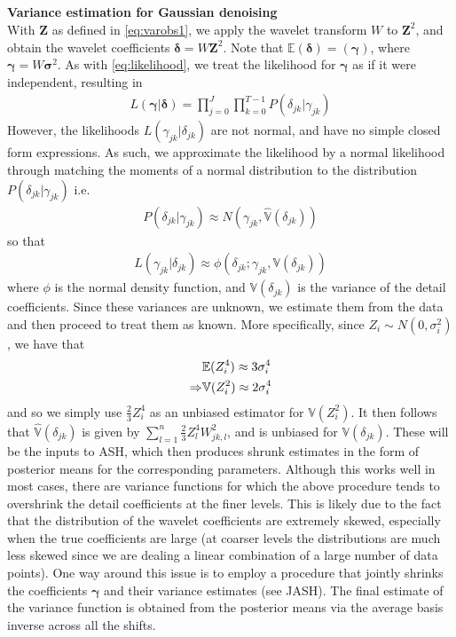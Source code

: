 \documentclass[12pt]{article}
\newcommand{\Gg}{\gamma}     \newcommand{\GG}{\Gamma}
\newcommand{\Gd}{\delta}     \newcommand{\GD}{\Delta}
\newcommand{\s}{\sigma}
\begin{document}
\begin{appendices}
\section{}\label{app:var estimation}\bigskip
\textbf{Variance estimation for Gaussian denoising}\bigskip\\
With $\bm{Z}$ as defined in \eqref{eq:varobs1}, we apply the wavelet transform $W$ to $\bm{Z}^2$, and obtain the wavelet coefficients $\bm{\Gd}=W\bm{Z}^2$. Note that $\mathbb{E}(\bm{\Gd})=(\bm{\Gg})$, where $\bm{\Gg}=W\bm{\s}^2$. As with \eqref{eq:likelihood}, we treat the likelihood for $\bm{\Gg}$ as if it were independent, resulting in
\begin{eqnarray}
L(\bm{\Gg}|\bm{\Gd})=\prod_{j=0}^J\prod_{k=0}^{T-1}P(\Gd_{jk}|\Gg_{jk})
\end{eqnarray}
However, the likelihoods $L(\Gg_{jk}|\Gd_{jk})$ are not normal, and have no simple closed form expressions. As such, we approximate the likelihood by a normal likelihood through matching the moments of a normal distribution to the distribution $P(\Gd_{jk}|\Gg_{jk})$ i.e.
\begin{eqnarray}
P(\Gd_{jk}|\Gg_{jk})\approx N(\Gg_{jk},\hat{\mathbb{V}}(\Gd_{jk}))
\end{eqnarray}
so that
\begin{eqnarray}\label{eq:gaus approx}
L(\Gg_{jk}|\Gd_{jk})\approx \phi(\Gd_{jk};\Gg_{jk},\mathbb{V}(\Gd_{jk}))
\end{eqnarray}
where $\phi$ is the normal density function, and $\mathbb{V}(\Gd_{jk})$ is the variance of the detail coefficients. Since these variances are unknown, we estimate them from the data and then proceed to treat them as known. More specifically, since $Z_i\sim N(0,\s_i^2)$, we have that
\begin{eqnarray}
&\mathbb{E}(Z_i^4)\approx 3\s_i^4\notag\\
\label{eq:varvarest}\Rightarrow&\mathbb{V}(Z_i^2)\approx 2\s_i^4
\end{eqnarray}
and so we simply use $\frac{2}{3}Z_i^4$ as an unbiased estimator for $\mathbb{V}(Z_i^2)$. It then follows that $\hat{\mathbb{V}}(\Gd_{jk})$ is given by $\sum_{l=1}^n \frac{2}{3}Z_l^4W_{jk,l}^2$, and is unbiased for $\mathbb{V}(\Gd_{jk})$. These will be the inputs to ASH, which then produces shrunk estimates in the form of posterior means for the corresponding parameters. Although this works well in most cases, there are variance functions for which the above procedure tends to overshrink the detail coefficients at the finer levels. This is likely due to the fact that the distribution of the wavelet coefficients are extremely skewed, especially when the true coefficients are large (at coarser levels the distributions are much less skewed since we are dealing a linear combination of a large number of data points). One way around this issue is to employ a procedure that jointly shrinks the coefficients $\bm{\Gg}$ and their variance estimates (see JASH). The final estimate of the variance function is obtained from the posterior means via the average basis inverse across all the shifts.\bigskip\\


\end{appendices}
\end{document}
